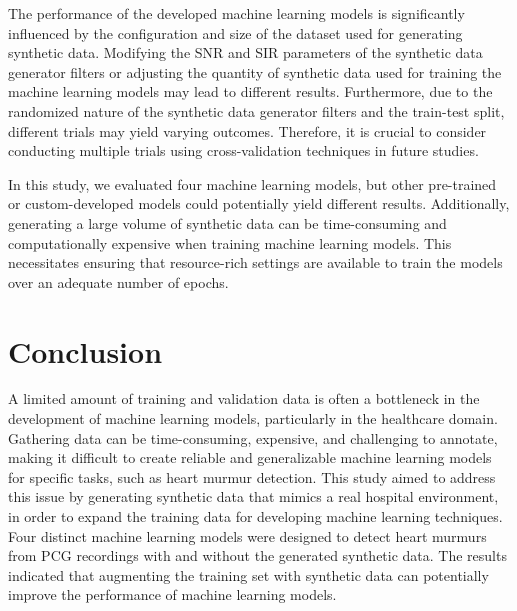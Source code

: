 \documentclass{article}
\begin{document}
\par The performance of the developed machine learning models is significantly influenced by the configuration and size of the dataset used for generating synthetic data. Modifying the SNR and SIR parameters of the synthetic data generator filters or adjusting the quantity of synthetic data used for training the machine learning models may lead to different results. Furthermore, due to the randomized nature of the synthetic data generator filters and the train-test split, different trials may yield varying outcomes. Therefore, it is crucial to consider conducting multiple trials using cross-validation techniques in future studies.

\par In this study, we evaluated four machine learning models, but other pre-trained or custom-developed models could potentially yield different results. Additionally, generating a large volume of synthetic data can be time-consuming and computationally expensive when training machine learning models. This necessitates ensuring that resource-rich settings are available to train the models over an adequate number of epochs.


\section{Conclusion}
A limited amount of training and validation data is often a bottleneck in the development of machine learning models, particularly in the healthcare domain. Gathering data can be time-consuming, expensive, and challenging to annotate, making it difficult to create reliable and generalizable machine learning models for specific tasks, such as heart murmur detection. This study aimed to address this issue by generating synthetic data that mimics a real hospital environment, in order to expand the training data for developing machine learning techniques. Four distinct machine learning models were designed to detect heart murmurs from PCG recordings with and without the generated synthetic data. The results indicated that augmenting the training set with synthetic data can potentially improve the performance of machine learning models.



\end{document}
